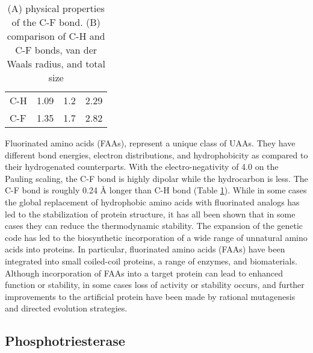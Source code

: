 \begin{refsection}
\begin{table}[h!]
\begin{tabular}{ llll }
  C-H & 1.09 & 1.2 & 2.29 \\
  C-F & 1.35 & 1.7 & 2.82 \\

  \hline
\end{tabular}
\caption[(A) physical properties of the C-F bond. (B) comparison of C-H and C-F
bonds, van der Waals radius, and total size]{(A) physical properties of the C-F
bond. (B) comparison of C-H and C-F bonds, van der Waals radius, and total
size\cite{Tang2001,Odar2015}}
\label{tab:c-fbond}
\end{table}

Fluorinated amino acids (FAAs), represent a unique class of UAAs. They have
different bond energies, electron distributions, and
hydrophobicity\cite{Biffinger2004} as compared to their hydrogenated
counterparts. With the electro-negativity of 4.0 on the Pauling scaling, the
C-F bond is highly dipolar while the hydrocarbon is less. The C-F bond is
roughly 0.24 {\AA} longer than C-H bond (Table
\ref{tab:c-fbond})\cite{Tang2001}. While in some cases the global replacement
of hydrophobic amino acids with fluorinated analogs has led to the
stabilization of protein structure\cite{Biffinger2004}, it has all been shown
that in some cases they can reduce the thermodynamic
stability\cite{Panchenko2006b}. The expansion of the genetic code has led to
the biosynthetic incorporation of a wide range of unnatural amino acids into
proteins\cite{Voloshchuk2010}. In particular, fluorinated amino acids (FAAs)
have been integrated into small coiled-coil
proteins\cite{Montclare2009b,Tang2001}, a range of
enzymes\cite{Voloshchuk2009,Panchenko2006b,Voloshchuk2007b,Mehta2011b,Hammill2007},
and biomaterials\cite{Yuvienco2012b}. Although incorporation of FAAs into a
target protein can lead to enhanced function or stability, in some cases loss
of activity or stability occurs, and further improvements to the artificial
protein have been made by rational mutagenesis\cite{Voloshchuk2007b} and
directed evolution strategies\cite{Montclare2006b}.

\subsection{Phosphotriesterase} 
\label{sec:pte-intro}


\end{refsection}
